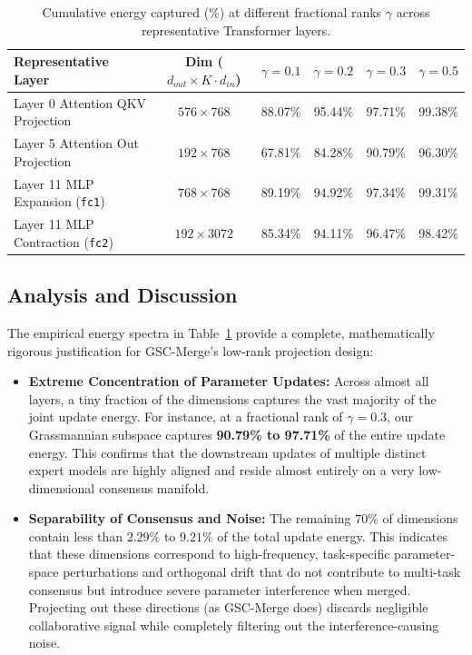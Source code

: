\documentclass{article}
\theoremstyle{plain}
\theoremstyle{definition}
\theoremstyle{remark}
\begin{document}
\begin{table}[h]
\caption{Cumulative energy captured (\%) at different fractional ranks $\gamma$ across representative Transformer layers.}
\label{tab:energy_captured}
\vskip 0.15in
\begin{center}
\begin{small}
\begin{sc}
\begin{tabular}{lccccc}
\toprule
Representative Layer & Dim ($d_{out} \times K \cdot d_{in}$) & $\gamma = 0.1$ & $\gamma = 0.2$ & $\gamma = 0.3$ & $\gamma = 0.5$ \\
\midrule
Layer 0 Attention QKV Projection & $576 \times 768$ & 88.07\% & 95.44\% & 97.71\% & 99.38\% \\
Layer 5 Attention Out Projection & $192 \times 768$ & 67.81\% & 84.28\% & 90.79\% & 96.30\% \\
Layer 11 MLP Expansion (\texttt{fc1}) & $768 \times 768$ & 89.19\% & 94.92\% & 97.34\% & 99.31\% \\
Layer 11 MLP Contraction (\texttt{fc2}) & $192 \times 3072$ & 85.34\% & 94.11\% & 96.47\% & 98.42\% \\
\bottomrule
\end{tabular}
\end{sc}
\end{small}
\end{center}
\vskip -0.1in
\end{table}

\subsection{Analysis and Discussion}

The empirical energy spectra in Table~\ref{tab:energy_captured} provide a complete, mathematically rigorous justification for GSC-Merge's low-rank projection design:
\begin{itemize}
    \item \textbf{Extreme Concentration of Parameter Updates:} Across almost all layers, a tiny fraction of the dimensions captures the vast majority of the joint update energy. For instance, at a fractional rank of $\gamma = 0.3$, our Grassmannian subspace captures \textbf{90.79\% to 97.71\%} of the entire update energy. This confirms that the downstream updates of multiple distinct expert models are highly aligned and reside almost entirely on a very low-dimensional consensus manifold.
    \item \textbf{Separability of Consensus and Noise:} The remaining $70\%$ of dimensions contain less than $2.29\%$ to $9.21\%$ of the total update energy. This indicates that these dimensions correspond to high-frequency, task-specific parameter-space perturbations and orthogonal drift that do not contribute to multi-task consensus but introduce severe parameter interference when merged. Projecting out these directions (as GSC-Merge does) discards negligible collaborative signal while completely filtering out the interference-causing noise.
\end{itemize}
\end{document}
